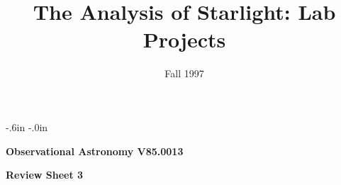  
\topmargin -.6in 
\textheight 8.7in 
\oddsidemargin -.0in 
\textwidth 6.5in 
\title{The Analysis of Starlight: Lab Projects} 
\date{Fall 1997} 
 
\setcounter{page}{1} 
\setcounter{equation}{0} 
\pagestyle{empty} 
\parindent 0pt 
\parskip 8pt 
\def\arcsec{\ifmmode {^{\scriptscriptstyle\prime\prime}}
          \else $^{\scriptscriptstyle\prime\prime}$\fi}
\def\arcmin{\ifmmode {^{\scriptscriptstyle\prime}}
          \else $^{\scriptscriptstyle\prime}$\fi}
\def\deg{\ifmmode^\circ\else$^\circ$\fi}   
 
\noindent 
{\bf Observational Astronomy      \hfill  V85.0013}\\ 
 
\bigskip 
 
\noindent 
{\hfill \Large {\bf Review Sheet 3} \hfill} 
 
